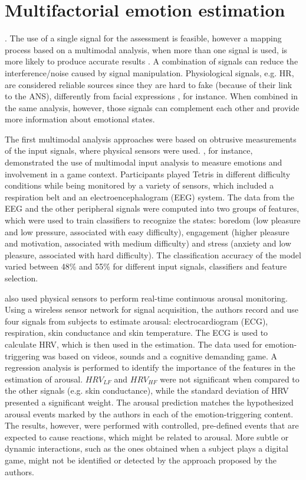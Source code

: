 \chapter{Multifactorial emotion estimation}

. The use of a single signal for the assessment is feasible, however a mapping process based on a multimodal analysis, when more than one signal is used, is more likely to produce accurate results \parencite{kukolja2014comparative}. A combination of signals can reduce the interference/noise caused by signal manipulation. Physiological signals, e.g. HR, are considered reliable sources since they are hard to fake (because of their link to the ANS), differently from facial expressions \parencite{Landowska}, for instance. When combined in the same analysis, however, those signals can complement each other and provide more information about emotional states.

The first multimodal analysis approaches were based on obtrusive measurements of the input signals, where physical sensors were used. \textcite{Chanel_2011}, for instance, demonstrated the use of multimodal input analysis to measure emotions and involvement in a game context. Participants played Tetris in different difficulty conditions while being monitored by a variety of sensors, which included a respiration belt and an electroencephalogram (EEG) system. The data from the EEG and the other peripheral signals were computed into two groups of features, which were used to train classifiers to recognize the states: boredom (low pleasure and low pressure, associated with easy difficulty), engagement (higher pleasure and motivation, associated with medium difficulty) and stress (anxiety and low pleasure, associated with hard difficulty). The classification accuracy of the model varied between 48\% and 55\% for different input signals, classifiers and feature selection.

\textcite{grundlehner2009design} also used physical sensors to perform real-time continuous arousal monitoring. Using a wireless sensor network for signal acquisition, the authors record and use four signals from subjects to estimate arousal: electrocardiogram (ECG), respiration, skin conductance and skin temperature. The ECG is used to calculate HRV, which is then used in the estimation. The data used for emotion-triggering was based on videos, sounds and a cognitive demanding game. A regression analysis is performed to identify the importance of the features in the estimation of arousal. $HRV_{LF}$ and $HRV_{HF}$ were not significant when compared to the other signals (e.g. skin conductance), while the standard deviation of HRV presented a significant weight. The arousal prediction matches the hypothesized arousal events marked by the authors in each of the emotion-triggering content. The results, however, were performed with controlled, pre-defined events that are expected to cause reactions, which might be related to arousal. More subtle or dynamic interactions, such as the ones obtained when a subject plays a digital game, might not be identified or detected by the approach proposed by the authors.

